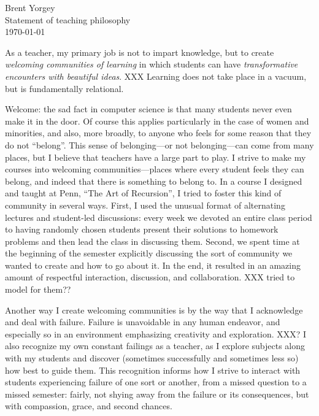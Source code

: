 \documentclass{article}
\begin{document}
\noindent Brent Yorgey \\
Statement of teaching philosophy \\
\today
\bigskip

As a teacher, my primary job is not to impart knowledge, but to create
\emph{welcoming communities of learning} in which students can have
\emph{transformative encounters with beautiful ideas}.  XXX Learning does
not take place in a vacuum, but is fundamentally relational.

Welcome: the sad fact in computer science is that many students never
even make it in the door.  Of course this applies particularly in the
case of women and minorities, and also, more broadly, to anyone who
feels for some reason that they do not ``belong''.  This sense of
belonging---or not belonging---can come from many places, but I
believe that teachers have a large part to play.  I strive to make my
courses into welcoming communities---places where every student feels
they can belong, and indeed that there is something to belong to.  In
a course I designed and taught at Penn, ``The Art of Recursion'', I
tried to foster this kind of community in several ways.  First, I used
the unusual format of alternating lectures and student-led
discussions: every week we devoted an entire class period to having
randomly chosen students present their solutions to homework problems
and then lead the class in discussing them.  Second, we spent time at
the beginning of the semester explicitly discussing the sort of
community we wanted to create and how to go about it.  In the end, it
resulted in an amazing amount of respectful interaction, discussion,
and collaboration.  XXX tried to model for them??

Another way I create welcoming communities is by the way that I
acknowledge and deal with failure.  Failure is unavoidable in any
human endeavor, and especially so in an environment emphasizing
creativity and exploration.  XXX? I also recognize my own constant
failings as a teacher, as I explore subjects along with my students
and discover (sometimes successfully and sometimes less so) how best
to guide them.  This recognition informs how I strive to interact with
students experiencing failure of one sort or another, from a missed
question to a missed semester: fairly, not shying away from the
failure or its consequences, but with compassion, grace, and second
chances.
\end{document}
